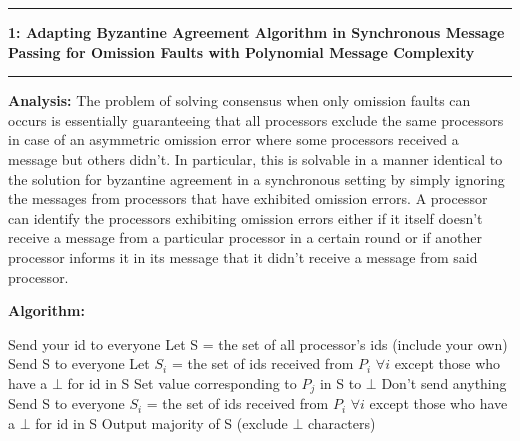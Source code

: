 \documentclass[11pt]{article}
\newcommand\question[2]{\vspace{.25in}\hrule\textbf{#1: #2}\vspace{.5em}\hrule\vspace{.10in}}
\newcommand\analysis{\vspace{.10in}\textbf{Analysis: }\newline}
\newcommand\algorithm{\vspace{.10in}\textbf{Algorithm: }}
\begin{document}
\raggedright
\newcommand\NAME{Siddharth Joshi}  %
\newcommand\HWNUM{4}              %


\question{1}{Adapting Byzantine Agreement Algorithm in Synchronous Message Passing for Omission Faults with Polynomial Message Complexity} 

\analysis
The problem of solving consensus when only omission faults can occurs is essentially guaranteeing that all processors exclude the same processors in case of an asymmetric omission error where some processors received a message but others didn't. In particular, this is solvable in a manner identical to the solution for byzantine agreement in a synchronous setting by simply ignoring the messages from processors that have exhibited omission errors. 
A processor can identify the processors exhibiting omission errors either if it itself doesn't receive a message from a particular processor in a certain round or if another processor informs it in its message that it didn't receive a message from said processor. 

\algorithm
\begin{algorithmic}
\State Send your id to everyone 
\State Let S = the set of all processor's ids (include your own) 
\State Send S to everyone 
\State Let $S_i$ = the set of ids received from $P_i$ $\forall i$ except those who have a $\bot$ for id in S
            \State Set value corresponding to $P_j$ in S to $\bot$
        \EndIf
    \EndFor
        \State Don't send anything 
    \Else
        \State Send S to everyone 
    \EndIf
    \State $S_i$ = the set of ids received from $P_i$ $\forall i$ except those who have a $\bot$ for id in S
\EndWhile
\State Output majority of S (exclude $\bot$ characters)
\end{algorithmic}
\end{document}
